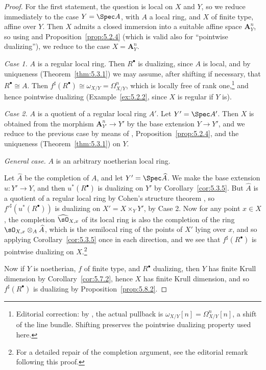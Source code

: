 \begin{proof}
For the first statement, the question is local on $X$ and $Y$, so we reduce immediately to the case $Y=\Spec A$, with $A$ a local ring, and $X$ of finite type, affine over $Y$. Then $X$ admits a closed immersion into a suitable affine space $\mathbf{A}_{Y}^{n}$, so using  and Proposition~\ref{prop:5.2.4} (which is valid also for ``pointwise dualizing''), we reduce to the case $X=\mathbf{A}_{Y}^{n}$.

\medskip\noindent\textit{Case 1.} $A$ is a regular local ring. Then $R^\bullet$ is dualizing, since $A$ is local, and by uniqueness (Theorem~\ref{thm:5.3.1}) we may assume, after shifting if necessary, that $R^\bullet\cong A$. Then $f^{\sharp}(R^\bullet)\cong\omega_{X/Y}=\Omega_{X/Y}^{n}$, which is locally free of rank one,\footnote{Editorial correction: by , the actual pullback is $\omega_{X/Y}[n]=\Omega^n_{X/Y}[n]$, a shift of the line bundle. Shifting preserves the pointwise dualizing property used here.} and hence pointwise dualizing (Example~\ref{ex:5.2.2}, since $X$ is regular if $Y$ is).

\medskip\noindent\textit{Case 2.} $A$ is a quotient of a regular local ring $A'$. Let $Y'=\Spec A'$. Then $X$ is obtained from the morphism $\mathbf{A}_{Y'}^{n}\to Y'$ by the base extension $Y\to Y'$, and we reduce to the previous case by means of , Proposition~\ref{prop:5.2.4}, and the uniqueness (Theorem~\ref{thm:5.3.1}) on $Y$.

\medskip\noindent\textit{General case.} $A$ is an arbitrary noetherian local ring.

Let $\widehat{A}$ be the completion of $A$, and let $Y'=\Spec\widehat{A}$. We make the base extension $u\colon Y'\to Y$, and then $u^{*}(R^\bullet)$ is dualizing on $Y'$ by Corollary~\ref{cor:5.3.5}. But $\widehat{A}$ is a quotient of a regular local ring by Cohen's structure theorem \cite[\nopp (31.1)]{14}, so $f'^{\sharp}(u^{*}(R^\bullet))$ is dualizing on $X' = X\times_{Y} Y'$, by Case 2. Now for any point $x\in X$, the completion $\widehat{\sO}_{X,x}$ of its local ring is also the completion of the ring $\sO_{X,x}\otimes_{A}\widehat{A}$, which is the semilocal ring of the points of $X'$ lying over $x$, and so applying Corollary~\ref{cor:5.3.5} once in each direction, and  we see that $f^{\sharp}(R^\bullet)$ is pointwise dualizing on $X$.\footnote{For a detailed repair of the completion argument, see the editorial remark following this proof.}

Now if $Y$ is noetherian, $f$ of finite type, and $R^\bullet$ dualizing, then $Y$ has finite Krull dimension by Corollary~\ref{cor:5.7.2}, hence $X$ has finite Krull dimension, and so $f^{\sharp}(R^\bullet)$ is dualizing by Proposition~\ref{prop:5.8.2}.
\end{proof}

